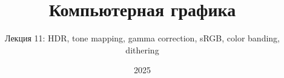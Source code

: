 \documentclass[10pt]{beamer}
\title{Компьютерная графика}
\subtitle{Лекция 11: HDR, tone mapping, gamma correction, sRGB, color banding, dithering}
\date{2025}
\newcommand{\slideimage}[1]{
  \begin{figure}
    \begin{adjustbox}{width=\textwidth, totalheight=\textheight-2\baselineskip-2\baselineskip,keepaspectratio}
      \texttt{[image: \#1]}
    \end{adjustbox}
  \end{figure}
}
\begin{document}
\frame{\titlepage}



\end{document}
